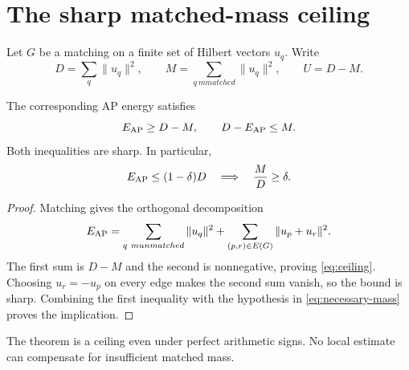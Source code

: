 \section{The sharp matched-mass ceiling}

Let $G$ be a matching on a finite set of Hilbert vectors $u_q$.  Write
\[
 D=\sum_q\|u_q\|^2,
 \qquad M=\sum_{q\ {
m matched}}\|u_q\|^2,
 \qquad U=D-M.
\]

\begin{theorem}
\label{thm:ceiling}
The corresponding AP energy satisfies
\begin{equation}
 E_{\rm AP}\ge D-M,
 \qquad D-E_{\rm AP}\le M.
 \label{eq:ceiling}
\end{equation}
Both inequalities are sharp.  In particular,
\begin{equation}
 E_{\rm AP}\le(1-\delta)D\quad\Longrightarrow\quad \frac MD\ge\delta.
 \label{eq:necessary-mass}
\end{equation}
\end{theorem}

\begin{proof}
Matching gives the orthogonal decomposition
\[
 E_{\rm AP}=\sum_{q\ {
m unmatched}}\|u_q\|^2
 +\sum_{(p,r)\in E(G)}\|u_p+u_r\|^2.
\]
The first sum is $D-M$ and the second is nonnegative, proving
\eqref{eq:ceiling}.  Choosing $u_r=-u_p$ on every edge makes the second sum vanish,
so the bound is sharp.  Combining the first inequality with the hypothesis in
\eqref{eq:necessary-mass} proves the implication.
\end{proof}

The theorem is a ceiling even under perfect arithmetic signs.  No local estimate can
compensate for insufficient matched mass.
